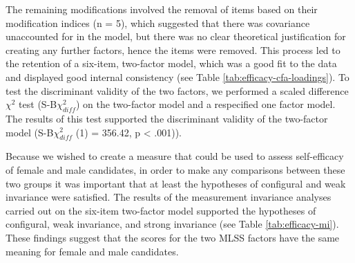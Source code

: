 \documentclass[
  12pt,
  a4paper,
]{book}
\begin{document}
The remaining modifications involved the removal of items based on their modification indices (n = 5), which suggested that there was covariance unaccounted for in the model, but there was no clear theoretical justification for creating any further factors, hence the items were removed. This process led to the retention of a six-item, two-factor model, which was a good fit to the data and displayed good internal consistency (see Table \ref{tab:efficacy-cfa-loadings}). To test the discriminant validity of the two factors, we performed a \citet{Satorra2001} scaled difference \(\chi^2\) test (S-B\(\chi^2_{diff}\)) on the two-factor model and a respecified one factor model. The results of this test supported the discriminant validity of the two-factor model (S-B\(\chi^2_{diff}\) (1) = 356.42, p \textless{} .001)).

Because we wished to create a measure that could be used to assess self-efficacy of female and male candidates, in order to make any comparisons between these two groups it was important that at least the hypotheses of configural and weak invariance were satisfied. The results of the measurement invariance analyses carried out on the six-item two-factor model supported the hypotheses of configural, weak invariance, and strong invariance (see Table \ref{tab:efficacy-mi}). These findings suggest that the scores for the two MLSS factors have the same meaning for female and male candidates.
\end{document}
